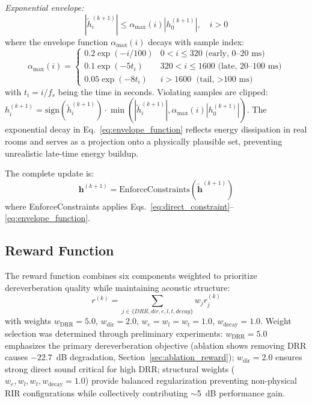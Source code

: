 \documentclass[12pt,a4paper]{article}
\begin{document}
\textit{Exponential envelope:}
\begin{equation}
|\tilde{h}_i^{(k+1)}| \leq \alpha_{\max}(i) |h_0^{(k+1)}|, \quad i>0
\label{eq:envelope_constraint}
\end{equation}
where the envelope function $\alpha_{\max}(i)$ decays with sample index:
\begin{equation}
\alpha_{\max}(i) = \begin{cases}
0.2\exp(-i/100) & 0 < i \leq 320 \text{ (early, 0--20~ms)} \\
0.1\exp(-5t_i) & 320 < i \leq 1600 \text{ (late, 20--100~ms)} \\
0.05\exp(-8t_i) & i > 1600 \text{ (tail, $>$100~ms)}
\end{cases}
\label{eq:envelope_function}
\end{equation}
with $t_i = i/f_s$ being the time in seconds. Violating samples are clipped: $h_i^{(k+1)} = \text{sign}(\tilde{h}_i^{(k+1)}) \cdot \min(|\tilde{h}_i^{(k+1)}|, \alpha_{\max}(i)|h_0^{(k+1)}|)$. The exponential decay in Eq.~\eqref{eq:envelope_function} reflects energy dissipation in real rooms and serves as a projection onto a physically plausible set, preventing unrealistic late-time energy buildup.

The complete update is:
\begin{equation}
\mathbf{h}^{(k+1)} = \text{EnforceConstraints}(\tilde{\mathbf{h}}^{(k+1)})
\label{eq:update_full}
\end{equation}
where EnforceConstraints applies Eqs.~\eqref{eq:direct_constraint}--\eqref{eq:envelope_function}.

\subsection{Reward Function}
\label{sec:reward}

The reward function combines six components weighted to prioritize dereverberation quality while maintaining acoustic structure:
\begin{equation}
r^{(k)} = \sum_{j \in \{DRR, dir, e, l, t, decay\}} w_j r_j^{(k)}
\label{eq:reward_total}
\end{equation}
with weights $w_{\text{DRR}}=5.0$, $w_{\text{dir}}=2.0$, $w_e=w_l=w_t=1.0$, $w_{\text{decay}}=1.0$. Weight selection was determined through preliminary experiments: $w_{\text{DRR}}=5.0$ emphasizes the primary dereverberation objective (ablation shows removing DRR causes $-22.7$~dB degradation, Section~\ref{sec:ablation_reward}); $w_{\text{dir}}=2.0$ ensures strong direct sound critical for high DRR; structural weights ($w_e, w_l, w_t, w_{\text{decay}}=1.0$) provide balanced regularization preventing non-physical RIR configurations while collectively contributing $\sim$5~dB performance gain.
\end{document}
